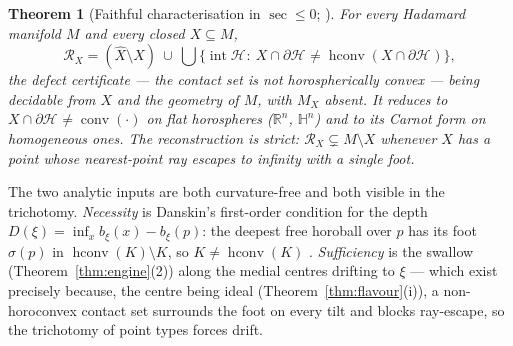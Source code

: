 \documentclass[11pt]{article}
\newtheorem{theorem}{Theorem}[section]
\theoremstyle{remark}
\newcommand{\R}{\mathbb{R}}
\newcommand{\X}{X}
\newcommand{\Xhat}{\widehat{\X}}
\newcommand{\Mx}{M_{\X}}
\newcommand{\Rx}{\mathcal{R}_{\X}}
\newcommand{\Hb}[1]{\mathcal{H}_{#1}}
\newcommand{\conv}{\operatorname{conv}}
\newcommand{\hconv}{\operatorname{hconv}}
\newcommand{\sect}{\operatorname{sec}}
\newcommand{\HH}{\mathbb{H}}
\begin{document}
\begin{theorem}[Faithful characterisation in $\sect\le0$;
{\cite[Thm.~3.3--3.4]{R3}}]\label{thm:hada}
For every Hadamard manifold $M$ and every closed $\X\subseteq M$,
\[
  \Rx=(\Xhat\setminus\X)\ \cup\
  \bigcup\bigl\{\operatorname{int}\Hb{}:\ \X\cap\partial\Hb{}\neq
  \hconv(\X\cap\partial\Hb{})\bigr\},
\]
the defect certificate --- the contact set is not horospherically convex
--- being decidable from $\X$ and the geometry of $M$, with $\Mx$ absent.
It reduces to $\X\cap\partial\Hb{}\neq\conv(\cdot)$ on flat horospheres
\textup{(}$\R^{n}$, $\HH^{n}$\textup{)} and to its Carnot form on
homogeneous ones. The reconstruction is strict: $\Rx\subsetneq
M\setminus\X$ whenever $\X$ has a point whose nearest-point ray escapes
to infinity with a single foot.
\end{theorem}

The two analytic inputs are both curvature-free and both visible in the
trichotomy. \emph{Necessity} is Danskin's first-order condition for the
depth $D(\xi)=\inf_{x}b_{\xi}(x)-b_{\xi}(p)$: the deepest free horoball
over $p$ has its foot $\sigma(p)$ in $\hconv(K)\setminus K$, so $K\neq
\hconv(K)$ \cite[Thm.~3.3]{R3}. \emph{Sufficiency} is the swallow
(Theorem~\ref{thm:engine}(2)) along the medial centres drifting to $\xi$
--- which exist precisely because, the centre being ideal
(Theorem~\ref{thm:flavour}(i)), a non-horoconvex contact set surrounds the
foot on every tilt and blocks ray-escape, so the trichotomy of point types
\cite[Thm.~2.1(4)]{R3} forces drift.
\end{document}
